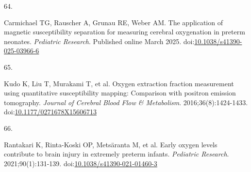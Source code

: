 \documentclass[
  letterpaper,
  DIV=11,
  numbers=noendperiod]{scrartcl}
\newlength{\cslhangindent}
\newlength{\csllabelwidth}
\newenvironment{CSLReferences}[2] %
 {\begin{list}{}{%
  \setlength{\itemindent}{0pt}
  \setlength{\leftmargin}{0pt}
  \setlength{\parsep}{0pt}
  \ifodd #1
   \setlength{\leftmargin}{\cslhangindent}
   \setlength{\itemindent}{-1\cslhangindent}
  \fi
  \setlength{\itemsep}{#2\baselineskip}}}
 {\end{list}}
\newcommand{\CSLLeftMargin}[1]{\parbox[t]{\csllabelwidth}{\strut#1\strut}}
\newcommand{\CSLRightInline}[1]{\parbox[t]{\linewidth - \csllabelwidth}{\strut#1\strut}}
\begin{document}
\begin{CSLReferences}{0}{1}
\CSLLeftMargin{64. }%
\CSLRightInline{Carmichael TG, Rauscher A, Grunau RE, Weber AM. The
application of magnetic susceptibility separation for measuring cerebral
oxygenation in preterm neonates. \emph{Pediatric Research}. Published
online March 2025.
doi:\href{https://doi.org/10.1038/s41390-025-03966-6}{10.1038/s41390-025-03966-6}}

\CSLLeftMargin{65. }%
\CSLRightInline{Kudo K, Liu T, Murakami T, et al. Oxygen extraction
fraction measurement using quantitative susceptibility mapping:
{Comparison} with positron emission tomography. \emph{Journal of
Cerebral Blood Flow \& Metabolism}. 2016;36(8):1424-1433.
doi:\href{https://doi.org/10.1177/0271678X15606713}{10.1177/0271678X15606713}}

\CSLLeftMargin{66. }%
\CSLRightInline{Rantakari K, Rinta-Koski OP, Metsäranta M, et al. Early
oxygen levels contribute to brain injury in extremely preterm infants.
\emph{Pediatric Research}. 2021;90(1):131-139.
doi:\href{https://doi.org/10.1038/s41390-021-01460-3}{10.1038/s41390-021-01460-3}}

\end{CSLReferences}

\label{3ade8a4a-fb1d-4a6c-8409-ac45482d5fc9}
\end{document}

